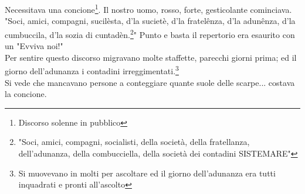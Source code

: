 Necessitava una concione\footnote{Discorso solenne in pubblico}. Il nostro uomo, rosso, forte, gesticolante cominciava.\\
"Soci, amici, compagni, sucilèsta, d'la sucietè, d'la fratelênza, d'la adunênza, d'la cumbuccila, d'la sozia di cuntadèn.\footnote{"Soci, amici, compagni, socialisti, della società, della fratellanza, dell'adunanza, della combucciella, della società dei contadini SISTEMARE"}" Punto e basta il repertorio era esaurito con un "Evviva noi!"\\
Per sentire questo discorso migravano molte staffette, parecchi giorni prima; ed il giorno  dell'adunanza i contadini irreggimentati.\footnote{Si muovevano in molti per ascoltare ed il giorno dell'adunanza era tutti inquadrati e pronti all'ascolto} \\
Si vede che mancavano persone a conteggiare quante suole delle scarpe... costava la concione.

